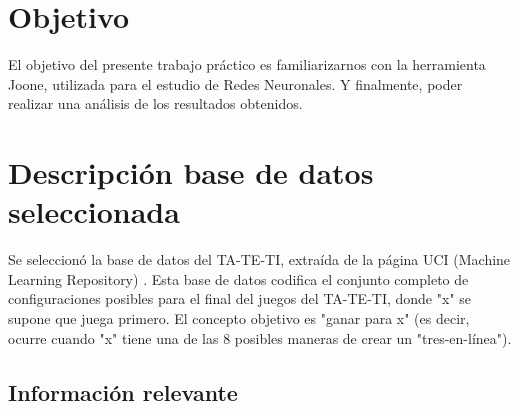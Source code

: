 \documentclass[12pt,titlepage]{article}
\begin{document}


\pagestyle{fancy}
\lhead{}
\chead{}
\rhead{}
\cfoot{}
\rfoot{\\\thepage}
\renewcommand{\headrulewidth}{0pt}



\setcounter{page}{2}

\newpage
\thispagestyle{empty}
\tableofcontents
\newpage



\section{Objetivo}
El objetivo del presente trabajo pr\'actico es familiarizarnos con la herramienta Joone, utilizada para el estudio de Redes Neuronales. Y finalmente, poder realizar una an\'alisis de los resultados obtenidos.

\section{Descripci\'on base de datos seleccionada}
Se seleccion\'o la base de datos del TA-TE-TI, extra\'ida de la p\'agina UCI (Machine Learning Repository) \cite{UCI}. Esta base de datos codifica el conjunto completo de configuraciones posibles para el final del juegos del TA-TE-TI, donde "x" se supone que juega primero. El concepto objetivo es "ganar para x" (es decir, ocurre cuando "x" tiene una de las 8 posibles maneras de crear un "tres-en-l\'inea").

\subsection{Informaci\'on relevante}
\end{document}
